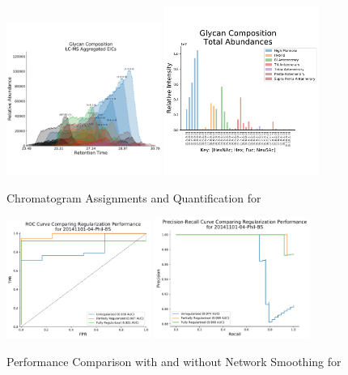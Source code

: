     \begin{figure}[!htb]
        \caption{Chromatogram Assignments and Quantification
                 for \philbs\label{fig:philbs_assignments}}
        \centering
        \includegraphics[width=0.45\textwidth,valign=t]{figure/phil_bs_chromatograms.pdf}
        \includegraphics[width=0.45\textwidth,valign=t]{figure/phil_bs_abundances.pdf}
    \end{figure}

    \begin{figure}[!htb]
        \caption{Performance Comparison with and without Network Smoothing for \philbs
                 \label{fig:philbs_perf}}
        \centering
        \includegraphics[width=0.42\textwidth,valign=t]{figure/phil_bs_native_roc.pdf}
        \includegraphics[width=0.45\textwidth,valign=t]{figure/phil_bs_native_prec_rec.pdf}
    \end{figure}

